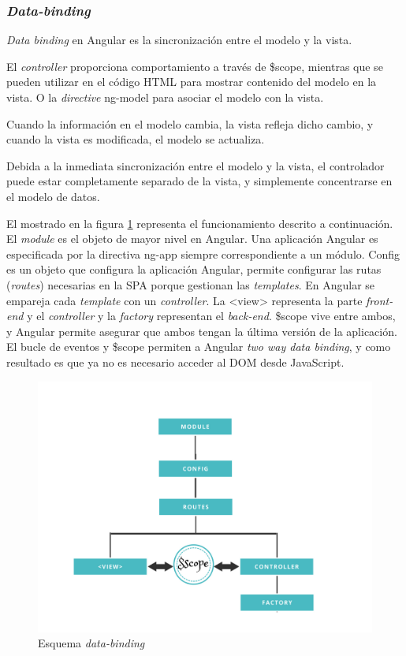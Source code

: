 \subsubsection{\textit{Data-binding}}
\textit{Data binding} en Angular es la sincronización entre el modelo y la vista.


El \textit{controller} proporciona comportamiento a través de \$scope, mientras que {{}} se pueden utilizar en el código HTML para mostrar contenido del modelo en la vista. O la \textit{directive} ng-model para asociar el modelo con la vista.


Cuando la información en el modelo cambia, la vista refleja dicho cambio, y cuando la vista es modificada, el modelo se actualiza.


Debida a la inmediata sincronización entre el modelo y la vista, el controlador puede estar completamente separado de la vista, y simplemente concentrarse en el modelo de datos\cite{data_binding_w3s}.


El mostrado en la figura \ref{fig:data_binding} representa el funcionamiento descrito a continuación. El \textit{module} es el objeto de mayor nivel en Angular. Una aplicación Angular es especificada por la directiva ng-app siempre correspondiente a un módulo.
Config es un objeto que configura la aplicación Angular, permite configurar las rutas (\textit{routes}) necesarias en la SPA porque gestionan las \textit{templates}. En Angular se empareja cada \textit{template} con un \textit{controller}. La <view> representa la parte \textit{front-end} y el \textit{controller} y la \textit{factory}  representan el \textit{back-end}. \$scope vive entre ambos, y Angular permite asegurar que ambos tengan la última versión de la aplicación. El bucle de eventos y \$scope permiten a Angular \textit{two way data binding}, y como resultado es que ya no es necesario acceder al DOM desde JavaScript\cite{praislee}.   


\begin{figure}[htbp] 
    \centering
    \includegraphics[width=1\textwidth]{figuras/data_binding.png}
    \caption{Esquema \textit{data-binding}}
    \label{fig:data_binding}
\end{figure}	


